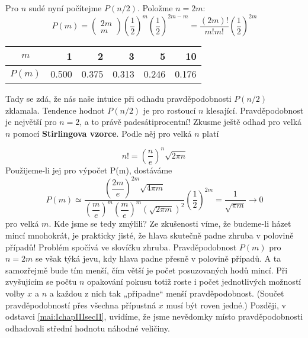 \begin{example}
  Pro \(n\) sudé nyní počítejme \(P(n/2)\). Položme \(n = 2m\):
  \begin{equation*}
    P(m) = \begin{pmatrix} 2m \\ m\end{pmatrix} 
           \left(\dfrac{1}{2}\right)^m\left(\dfrac{1}{2}\right)^{2m-m} 
         = \dfrac{(2m)!}{m!m!}\left(\dfrac{1}{2}\right)^{2m}     
  \end{equation*}

  \begin{table}[h]
    \centering
    \begin{tabular}{c|rrrrr}
      \(m\)    & 1 & 2 & 3 & 5 & 10  \\ \hline
      \(P(m)\) & \num{0.500} & \num{0.375} & \num{0.313} & \num{0.246} & \num{0.176}
    \end{tabular}
  \end{table}
  
  Tady se zdá, že nás naše intuice při odhadu pravděpodobnosti \(P(n/2)\) zklamala. Tendence hodnot 
  \(P(n/2)\) je pro rostoucí \(n\) klesající. Pravděpodobnost je největší pro \(n = 2\), a to právě 
  padesátiprocentní! Zkusme ještě odhad pro velká \(n\) pomocí \textbf{Stirlingova vzorce}. Podle 
  něj pro velká \(n\) platí
  
  \begin{equation}\label{mai:eq056}
    n! = \left(\dfrac{n}{e}\right)^n\sqrt{2\pi n}
  \end{equation}
  Použijeme-li jej pro výpočet P(m), dostáváme
  \begin{equation*}
    P(m)\simeq \dfrac{\left(\dfrac{2m}{e}\right)^{2m}\sqrt{4\pi m}}
     {\left(\dfrac{m}{e}\right)^m\left(\dfrac{m}{e}\right)^m\left(\sqrt{2\pi m}\right)^2}
     \left(\dfrac{1}{2}\right)^{2m} = \dfrac{1}{\sqrt{\pi m}} \longrightarrow 0
  \end{equation*}
  pro velká \(m\). Kde jsme se tedy zmýlili? Ze zkušenosti víme, že budeme-li házet mincí 
  mnohokrát, je prakticky jisté, že hlava skutečně padne zhruba v polovině případů! Problém spočívá 
  ve slovíčku zhruba. Pravděpodobnost \(P(m)\) pro \(n = 2m\) se však týká jevu, kdy hlava padne 
  přesně v polovině případů. A ta samozřejmě bude tím menší, čím větší je počet posuzovaných hodů 
  mincí. Při zvyšujícím se počtu \(n\) opakování pokusu totiž roste i počet jednotlivých možností 
  volby \(x\) a \(n\) a každou z nich tak „připadne“ menší pravděpodobnost. (Součet  
  pravděpodobností přes všechna přípustná \(x\) musí být roven jedné.) Později, v odstavci 
  \ref{mai:IchapIIIsecII}, uvidíme, že jsme nevědomky místo pravděpodobnosti odhadovali střední 
  hodnotu náhodné veličiny.
  

\end{example}
